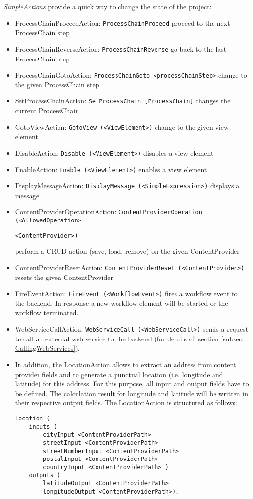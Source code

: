 \textit{SimpleActions} provide a quick way to change the state of the project:
\begin{itemize}
\item ProcessChainProceedAction: \lstinline!ProcessChainProceed!
\subitem proceed to the next ProcessChain step
\item ProcessChainReverseAction: \lstinline!ProcessChainReverse!
\subitem go back to the last ProcessChain step
\item ProcessChainGotoAction: \lstinline!ProcessChainGoto <processChainStep>!
\subitem change to the given ProcessChain step
\item SetProcessChainAction: \lstinline!SetProcessChain [ProcessChain]!
\subitem changes the current ProcessChain
\item GotoViewAction: \lstinline!GotoView (<ViewElement>)!
\subitem change to the given view element
\item DisableAction: \lstinline!Disable (<ViewElement>)!
\subitem disables a view element
\item EnableAction: \lstinline!Enable (<ViewElement>)!
\subitem enables a view element
\item DisplayMessageAction: \lstinline!DisplayMessage (<SimpleExpression>)!
\subitem displays a message
\item {ContentProviderOperationAction: \lstinline!ContentProviderOperation (<AllowedOperation>!

 \lstinline!<ContentProvider>)!}
\subitem perform a CRUD action (save, load, remove) on the given ContentProvider
\item ContentProviderResetAction: \lstinline!ContentProviderReset (<ContentProvider>)!
\subitem resets the given ContentProvider
\item FireEventAction: \lstinline!FireEvent (<WorkflowEvent>)!
\subitem fires a workflow event to the backend. In response a new workflow element will be started or the workflow terminated.

\item WebServiceCallAction: \lstinline!WebServiceCall (<WebServiceCall>)!
\subitem sends a request to call an external web service to the backend (for details cf. section \ref{subsec: CallingWebServices}).

\item In addition, the LocationAction allows to extract an address from content provider fields and to generate a punctual location (i.e. longitude and latitude) for this address. For this purpose, all input and output fields have to be defined. The calculation result for longitude and latitude will be written in their respective output fields. The LocationAction is structured as follows:

\begin{lstlisting}
Location (
	inputs (
		cityInput <ContentProviderPath>
		streetInput <ContentProviderPath>
		streetNumberInput <ContentProviderPath>
		postalInput <ContentProviderPath>
		countryInput <ContentProviderPath> )
	outputs (
		latitudeOutput <ContentProviderPath>
		longitudeOutput <ContentProviderPath>).
\end{lstlisting}

 
\end{itemize}


